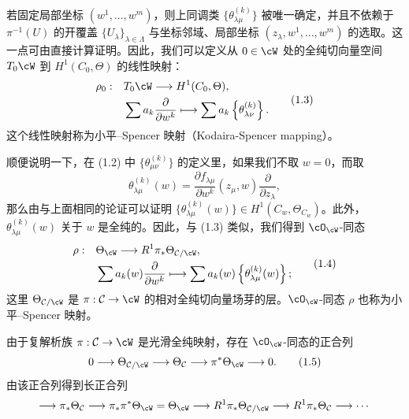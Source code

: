 若固定局部坐标 $(w^1,\dots,w^m)$，则上同调类 $\{\theta^{(k)}_{\lambda\mu}\}$ 被唯一确定，并且不依赖于 $\pi^{-1}(U)$ 的开覆盖 $\{U_\lambda\}_{\lambda\in\Lambda}$ 与坐标邻域、局部坐标 $(z_\lambda,w^1,\dots,w^m)$ 的选取。这一点可由直接计算证明。因此，我们可以定义从 $0\in\cW$ 处的全纯切向量空间 $T_0\cW$ 到 $H^1(C_0,\Theta)$ 的线性映射：
\begin{equation}
\begin{aligned}
\rho_0:\quad & T_0\cW \longrightarrow H^1(C_0,\Theta),\\
& \sum a_k\frac{\partial}{\partial w^k} \longmapsto \sum a_k\left\{\theta^{(k)}_{\lambda\nu}\right\}.
\end{aligned} \tag{1.3}
\end{equation}
这个线性映射称为小平–Spencer 映射（Kodaira-Spencer mapping）。

顺便说明一下，在 (1.2) 中 $\{\theta^{(k)}_{\mu\nu}\}$ 的定义里，如果我们不取 $w=0$，而取
\[
\theta^{(k)}_{\lambda\mu}(w)=\frac{\partial f_{\lambda\mu}}{\partial w^k}(z_\mu,w)\frac{\partial}{\partial z_\lambda},
\]
那么由与上面相同的论证可以证明 $\{\theta^{(k)}_{\lambda\mu}(w)\}\in H^1(C_w,\Theta_{C_w})$。此外，$\theta^{(k)}_{\lambda\mu}(w)$ 关于 $w$ 是全纯的。因此，与 (1.3) 类似，我们得到 $\cO_\cW$-同态
\begin{equation}
\begin{aligned}
\rho:\quad & \Theta_\cW \longrightarrow R^1\pi_*\Theta_{\mathcal{C}/\cW},\\
& \sum a_k(w)\frac{\partial}{\partial w^k}\longmapsto \sum a_k(w)\left\{\theta^{(k)}_{\lambda\mu}(w)\right\};
\end{aligned} \tag{1.4}
\end{equation}
这里 $\Theta_{\mathcal{C}/\cW}$ 是 $\pi:\mathcal{C}\to\cW$ 的相对全纯切向量场芽的层。$\cO_\cW$-同态 $\rho$ 也称为小平–Spencer 映射。

由于复解析族 $\pi:\mathcal{C}\to\cW$ 是光滑全纯映射，存在 $\cO_\cW$-同态的正合列
\begin{equation}
0\longrightarrow \Theta_{\mathcal{C}/\cW}\longrightarrow \Theta_{\mathcal{C}}\longrightarrow \pi^*\Theta_\cW\longrightarrow 0. \tag{1.5}
\end{equation}
由该正合列得到长正合列
\[
\longrightarrow \pi_*\Theta_{\mathcal{C}}\longrightarrow \pi_*\pi^*\Theta_\cW=\Theta_\cW\longrightarrow R^1\pi_*\Theta_{\mathcal{C}/\cW}\longrightarrow R^1\pi_*\Theta_{\mathcal{C}}\longrightarrow \cdots
\]

